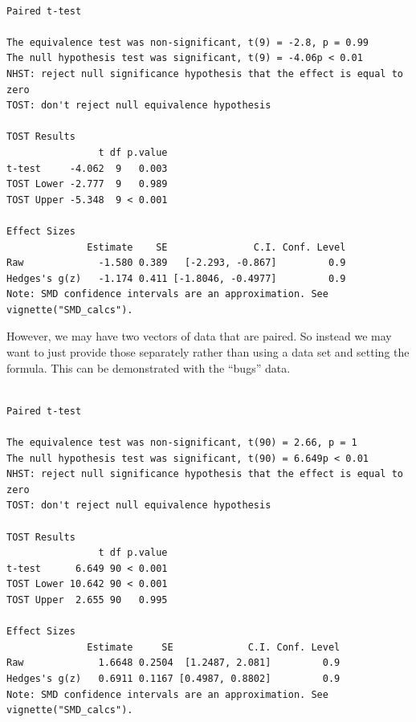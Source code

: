 \documentclass[
]{interact}
\newenvironment{Shaded}{\begin{snugshade}}{\end{snugshade}}
\newcommand{\AttributeTok}[1]{\textcolor[rgb]{0.40,0.45,0.13}{#1}}
\newcommand{\ConstantTok}[1]{\textcolor[rgb]{0.56,0.35,0.01}{#1}}
\newcommand{\DecValTok}[1]{\textcolor[rgb]{0.68,0.00,0.00}{#1}}
\newcommand{\FunctionTok}[1]{\textcolor[rgb]{0.28,0.35,0.67}{#1}}
\newcommand{\NormalTok}[1]{\textcolor[rgb]{0.00,0.23,0.31}{#1}}
\newcommand{\OtherTok}[1]{\textcolor[rgb]{0.00,0.23,0.31}{#1}}
\newcommand{\SpecialCharTok}[1]{\textcolor[rgb]{0.37,0.37,0.37}{#1}}
\begin{document}
\begin{verbatim}

Paired t-test

The equivalence test was non-significant, t(9) = -2.8, p = 0.99
The null hypothesis test was significant, t(9) = -4.06p < 0.01
NHST: reject null significance hypothesis that the effect is equal to zero 
TOST: don't reject null equivalence hypothesis

TOST Results 
                t df p.value
t-test     -4.062  9   0.003
TOST Lower -2.777  9   0.989
TOST Upper -5.348  9 < 0.001

Effect Sizes 
              Estimate    SE               C.I. Conf. Level
Raw             -1.580 0.389   [-2.293, -0.867]         0.9
Hedges's g(z)   -1.174 0.411 [-1.8046, -0.4977]         0.9
Note: SMD confidence intervals are an approximation. See vignette("SMD_calcs").
\end{verbatim}

\newpage

However, we may have two vectors of data that are paired. So instead we
may want to just provide those separately rather than using a data set
and setting the formula. This can be demonstrated with the ``bugs''
data.

\begin{Shaded}
\end{Shaded}

\begin{verbatim}

Paired t-test

The equivalence test was non-significant, t(90) = 2.66, p = 1
The null hypothesis test was significant, t(90) = 6.649p < 0.01
NHST: reject null significance hypothesis that the effect is equal to zero 
TOST: don't reject null equivalence hypothesis

TOST Results 
                t df p.value
t-test      6.649 90 < 0.001
TOST Lower 10.642 90 < 0.001
TOST Upper  2.655 90   0.995

Effect Sizes 
              Estimate     SE             C.I. Conf. Level
Raw             1.6648 0.2504  [1.2487, 2.081]         0.9
Hedges's g(z)   0.6911 0.1167 [0.4987, 0.8802]         0.9
Note: SMD confidence intervals are an approximation. See vignette("SMD_calcs").
\end{verbatim}
\end{document}
